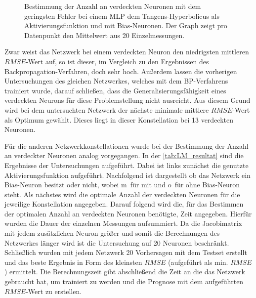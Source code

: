 \begin{figure}[!htb]
    \centering
        
    \caption[Beispiel zur Bestimmung der Anzahl verdeckter Neuronen beim LM]{Bestimmung der Anzahl an verdeckten Neuronen mit dem geringsten Fehler bei einem MLP dem Tangens-Hyperbolicus als Aktivierungsfunktion und mit Bias-Neuronen. Der Graph zeigt pro Datenpunkt den Mittelwert aus 20 Einzelmessungen.}
    \label{fig:LM_tanh_m-hneuron}
\end{figure}

Zwar weist das Netzwerk bei einem verdeckten Neuron den niedrigsten mittleren $RMSE$-Wert auf, so ist dieser, im Vergleich zu den Ergebnissen des Backpropagation-Verfahren, doch sehr hoch. Außerdem lassen die vorherigen Untersuchungen des gleichen Netzwerkes, welches mit dem BP-Verfahrens trainiert wurde, darauf schließen, dass die Generalisierungsfähigkeit eines verdeckten Neurons für diese Problemstellung nicht ausreicht. Aus diesem Grund wird bei dem untersuchten Netzwerk der nächste minimale mittlere $RMSE$-Wert als Optimum gewählt. Dieses liegt in dieser Konstellation bei 13 verdeckten Neuronen. 

Für die anderen Netzwerkkonstellationen wurde bei der Bestimmung der Anzahl an verdeckter Neuronen analog vorgegangen. In der \autoref{tab:LM_resultat} sind die Ergebnisse der Untersuchungen aufgeführt. Dabei ist links zunächst die genutzte Aktivierungsfunktion aufgeführt. Nachfolgend ist dargestellt ob das Netzwerk ein Bias-Neuron besitzt oder nicht, wobei \glqq m\grqq~für mit und \glqq o\grqq~für ohne Bias-Neuron steht. Als nächstes wird die optimale Anzahl der verdeckten Neuronen für die jeweilige Konstellation angegeben. Darauf folgend wird die, für das Bestimmen der optimalen Anzahl an verdeckten Neuronen benötigte, Zeit angegeben. Hierfür wurden die Dauer der einzelnen Messungen aufsummiert. Da die Jacobimatrix mit jedem zusätzlichen Neuron größer und somit die Berechnungen des Netzwerkes länger wird ist die Untersuchung auf 20 Neuronen beschränkt. Schließlich wurden mit jedem Netzwerk 20 Vorhersagen mit dem Testset erstellt und das beste Ergebnis in Form des kleinsten $RMSE$ (aufgeführt als min. $RMSE$) ermittelt. Die Berechnungszeit gibt abschließend die Zeit an die das Netzwerk gebraucht hat, um trainiert zu werden und die Prognose mit dem aufgeführten $RMSE$-Wert zu erstellen.

